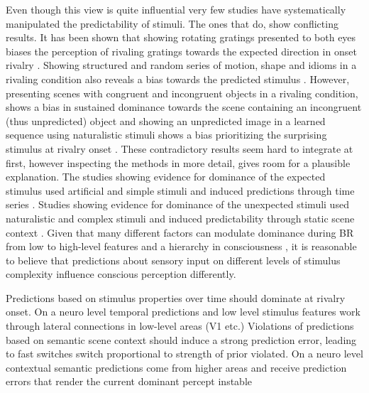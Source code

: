 \documentclass[]{article}
\begin{document}
Even though this view is quite influential very few studies have systematically manipulated the predictability of stimuli. The ones that do, show conflicting results. It has been shown that showing rotating gratings presented to both eyes biases the perception of rivaling gratings towards the expected direction in onset rivalry \parencite{denisonPredictiveContextInfluences2011, attarhaOnsetRivalryFactors2015}. Showing structured and random series of motion, shape and idioms in a rivaling condition also reveals a bias towards the predicted stimulus \parencite{huVisualTemporalIntegration2021}.
However, presenting scenes with congruent and incongruent objects in a rivaling condition, shows a bias in sustained dominance towards the scene containing an incongruent (thus unpredicted) object \parencite{mudrikSceneCongruencyBiases2011,zachariaDoesValenceInfluence2020} and showing an unpredicted image in a learned sequence using naturalistic stimuli shows a bias prioritizing the surprising stimulus at rivalry onset \parencite{denisonPerceptualSuppressionPredicted2016}.
These contradictory results seem hard to integrate at first, however inspecting the methods in more detail, gives room for a plausible explanation.
The studies showing evidence for dominance of the expected stimulus used artificial and simple stimuli and induced predictions through time series \parencite{denisonPredictiveContextInfluences2011,attarhaOnsetRivalryFactors2015,huVisualTemporalIntegration2021}. Studies showing evidence for dominance of the unexpected stimuli used naturalistic and complex stimuli and induced predictability through static scene context \parencite{mudrikSceneCongruencyBiases2011,zachariaDoesValenceInfluence2020}. 
Given that many different factors can modulate dominance during BR from low \parencite{brascampLawsBinocularRivalry2015} to high-level features \parencite{safaviMultistabilityPerceptualValue2022} and a hierarchy in consciousness \parencite{zekiDisunityConsciousness2003}, it is reasonable to believe that predictions about sensory input on different levels of stimulus complexity influence conscious perception differently.\par
Predictions based on stimulus properties over time should dominate at rivalry onset. On a neuro level temporal predictions and low level stimulus features work through lateral connections in low-level areas (V1 etc.)
Violations of predictions based on semantic scene context should induce a strong prediction error, leading to fast switches switch proportional to strength of prior violated.
On a neuro level contextual semantic predictions come from higher areas and receive prediction errors that render the current dominant percept instable
\end{document}
